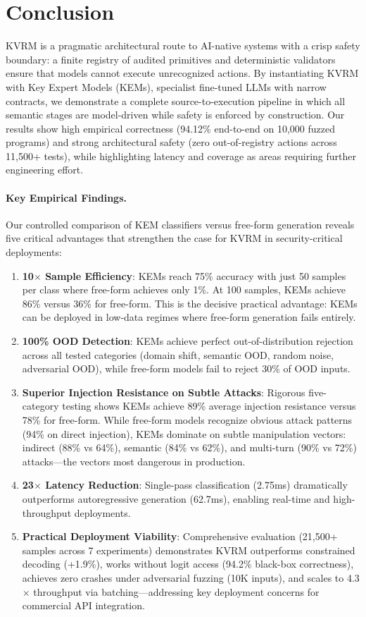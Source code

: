 \documentclass[11pt]{article}
\begin{document}
\section{Conclusion}
KVRM is a pragmatic architectural route to AI-native systems with a crisp safety boundary:
a finite registry of audited primitives and deterministic validators ensure that models cannot execute unrecognized actions.
By instantiating KVRM with Key Expert Models (KEMs), specialist fine-tuned LLMs with narrow contracts, we demonstrate a complete source-to-execution pipeline in which all semantic stages are model-driven while safety is enforced by construction.
Our results show high empirical correctness (94.12\% end-to-end on 10{,}000 fuzzed programs) and strong architectural safety (zero out-of-registry actions across 11{,}500+ tests), while highlighting latency and coverage as areas requiring further engineering effort.

\paragraph{Key Empirical Findings.}
Our controlled comparison of KEM classifiers versus free-form generation reveals five critical advantages that strengthen the case for KVRM in security-critical deployments:
\begin{enumerate}[leftmargin=*]
  \item \textbf{10$\times$ Sample Efficiency}: KEMs reach 75\% accuracy with just 50 samples per class where free-form achieves only 1\%. At 100 samples, KEMs achieve 86\% versus 36\% for free-form. This is the decisive practical advantage: KEMs can be deployed in low-data regimes where free-form generation fails entirely.
  \item \textbf{100\% OOD Detection}: KEMs achieve perfect out-of-distribution rejection across all tested categories (domain shift, semantic OOD, random noise, adversarial OOD), while free-form models fail to reject 30\% of OOD inputs.
  \item \textbf{Superior Injection Resistance on Subtle Attacks}: Rigorous five-category testing shows KEMs achieve 89\% average injection resistance versus 78\% for free-form. While free-form models recognize obvious attack patterns (94\% on direct injection), KEMs dominate on subtle manipulation vectors: indirect (88\% vs 64\%), semantic (84\% vs 62\%), and multi-turn (90\% vs 72\%) attacks---the vectors most dangerous in production.
  \item \textbf{23$\times$ Latency Reduction}: Single-pass classification (2.75ms) dramatically outperforms autoregressive generation (62.7ms), enabling real-time and high-throughput deployments.
  \item \textbf{Practical Deployment Viability}: Comprehensive evaluation (21{,}500+ samples across 7 experiments) demonstrates KVRM outperforms constrained decoding (+1.9\%), works without logit access (94.2\% black-box correctness), achieves zero crashes under adversarial fuzzing (10K inputs), and scales to 4.3$\times$ throughput via batching---addressing key deployment concerns for commercial API integration.
\end{enumerate}
\end{document}
